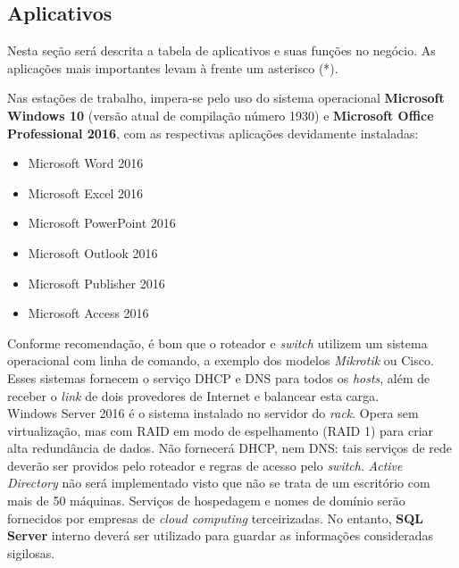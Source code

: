 \documentclass[	DIV=calc,%
							paper=a4,%
							fontsize=12pt,%
							onecolumn]{scrartcl}	 					%
\begin{document}
\subsection{Aplicativos}

Nesta seção será descrita a tabela de aplicativos e suas funções no negócio. As aplicações mais importantes levam à frente um asterisco (*).







Nas estações de trabalho, impera-se pelo uso do sistema operacional \textbf{Microsoft Windows 10} (versão atual de compilação número 1930) e \textbf{Microsoft Office Professional 2016}, com as respectivas aplicações devidamente instaladas: \\ 

\begin{itemize}
	\item Microsoft Word 2016 
	\item Microsoft Excel 2016
	\item Microsoft PowerPoint 2016
	\item Microsoft Outlook 2016
	\item Microsoft Publisher 2016
	\item Microsoft Access 2016
\end{itemize}



Conforme recomendação, é bom que o roteador e \textit{switch} utilizem um sistema operacional com linha de comando, a exemplo dos modelos \textit{Mikrotik} ou Cisco. Esses sistemas fornecem o serviço DHCP e DNS para todos os \textit{hosts}, além de receber o \textit{link} de dois provedores de Internet e balancear esta carga.
\\

Windows Server 2016 é o sistema instalado no servidor do \textit{rack}. Opera sem virtualização, mas com RAID em modo de espelhamento (RAID 1) para criar alta redundância de dados. Não fornecerá DHCP, nem DNS: tais serviços de rede deverão ser providos pelo roteador e regras de acesso pelo \textit{switch}. \textit{Active Directory }não será implementado visto que não se trata de um escritório com mais de 50 máquinas. Serviços de hospedagem e nomes de domínio serão fornecidos por empresas de \textit{cloud computing} terceirizadas. No entanto, \textbf{SQL Server} interno deverá ser utilizado para guardar as informações consideradas sigilosas.
\end{document}
